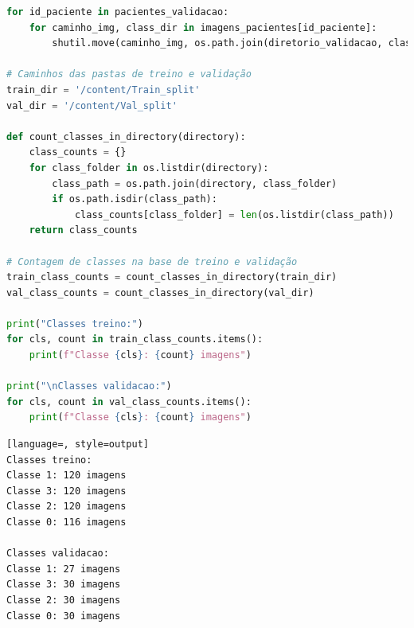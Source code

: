 \begin{lstlisting}[language=Python, style=input]
for id_paciente in pacientes_validacao:
    for caminho_img, class_dir in imagens_pacientes[id_paciente]:
        shutil.move(caminho_img, os.path.join(diretorio_validacao, class_dir, os.path.basename(caminho_img)))

# Caminhos das pastas de treino e validação
train_dir = '/content/Train_split'
val_dir = '/content/Val_split'

def count_classes_in_directory(directory):
    class_counts = {}
    for class_folder in os.listdir(directory):
        class_path = os.path.join(directory, class_folder)
        if os.path.isdir(class_path):
            class_counts[class_folder] = len(os.listdir(class_path))
    return class_counts

# Contagem de classes na base de treino e validação
train_class_counts = count_classes_in_directory(train_dir)
val_class_counts = count_classes_in_directory(val_dir)

print("Classes treino:")
for cls, count in train_class_counts.items():
    print(f"Classe {cls}: {count} imagens")

print("\nClasses validacao:")
for cls, count in val_class_counts.items():
    print(f"Classe {cls}: {count} imagens")
\end{lstlisting}

\begin{lstlisting}[language=, style=output]
Classes treino:
Classe 1: 120 imagens
Classe 3: 120 imagens
Classe 2: 120 imagens
Classe 0: 116 imagens

Classes validacao:
Classe 1: 27 imagens
Classe 3: 30 imagens
Classe 2: 30 imagens
Classe 0: 30 imagens
\end{lstlisting}


